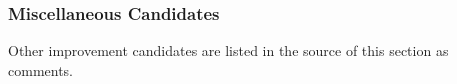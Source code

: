 \subsubsection{Miscellaneous Candidates}
\label{sec:app:styleguide:Miscellaneous Candidates}

Other improvement candidates are listed in the source of this
section as comments.

%
%
%
%
%
%

